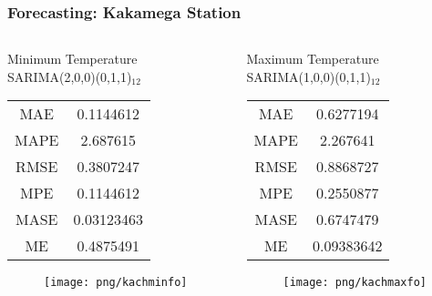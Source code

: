 \documentclass[]{beamer}
\begin{document}
\begin{frame}
\frametitle{Forecasting: Kakamega Station}
\fontsize{5pt}{7.5}\selectfont
\begin{columns}
	\begin{column}{.25\textwidth}
		\begin{center}
		\begin{table}
				Minimum Temperature\\
				SARIMA(2,0,0)(0,1,1)$_{12} $\\
				\begin{tabular}{c| c}
					\hline
					MAE & 0.1144612 \\
					MAPE & 2.687615 \\
					RMSE & 0.3807247 \\
					MPE & 0.1144612\\
					MASE & 0.03123463 \\
					ME & 0.4875491 \\
				\end{tabular}
		\end{table}
	\end{center}
	\begin{figure}[H]
	\hspace*{-2cm}\texttt{[image: png/kachminfo]}	
	\end{figure}
	\end{column}
	\begin{column}{.25\textwidth}
	\begin{table}
		\begin{center}
			Maximum Temperature\\
			SARIMA(1,0,0)(0,1,1)$_{12}$\\
			\begin{tabular}{c| c}
				\hline
				MAE & 0.6277194 \\
				MAPE & 2.267641 \\
				RMSE & 0.8868727 \\
				MPE & 0.2550877 \\
				MASE & 0.6747479 \\
				ME & 0.09383642 \\
			\end{tabular}
		\end{center}
	\end{table}
	\begin{figure}[H]	
	\hspace*{-1cm}\texttt{[image: png/kachmaxfo]}
	\end{figure}	
	\end{column}
\end{columns}
\end{frame}
\end{document}
